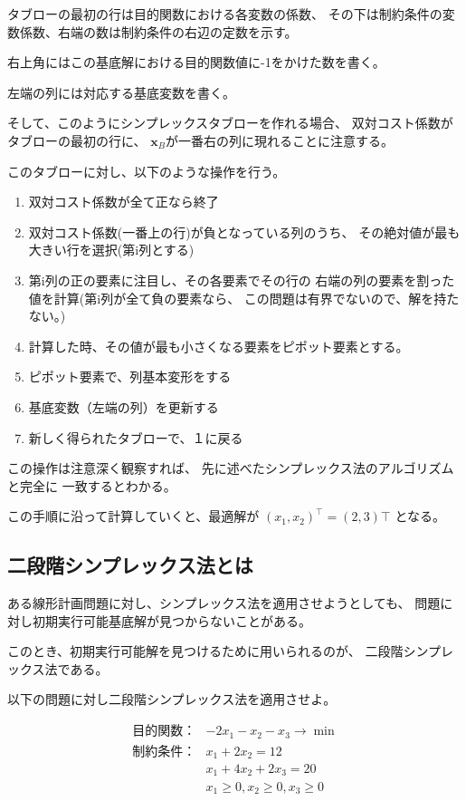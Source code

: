 \documentclass[9pt]{ltjsreport}
\begin{document}
タブローの最初の行は目的関数における各変数の係数、
その下は制約条件の変数係数、右端の数は制約条件の右辺の定数を示す。

右上角にはこの基底解における目的関数値に-1をかけた数を書く。

左端の列には対応する基底変数を書く。

そして、このようにシンプレックスタブローを作れる場合、
双対コスト係数がタブローの最初の行に、
$\bm{x}_B$が一番右の列に現れることに注意する。

このタブローに対し、以下のような操作を行う。

\begin{enumerate}
    \item 双対コスト係数が全て正なら終了
    \item 双対コスト係数(一番上の行)が負となっている列のうち、
    その絶対値が最も大きい行を選択(第i列とする)
    \item 第i列の正の要素に注目し、その各要素でその行の
    右端の列の要素を割った値を計算(第i列が全て負の要素なら、
    この問題は有界でないので、解を持たない。)
    \item 計算した時、その値が最も小さくなる要素をピポット要素とする。
    \item ピポット要素で、列基本変形をする
    \item 基底変数（左端の列）を更新する
    \item 新しく得られたタブローで、１に戻る
\end{enumerate}
この操作は注意深く観察すれば、
先に述べたシンプレックス法のアルゴリズムと完全に
一致するとわかる。

この手順に沿って計算していくと、最適解が
$(x_1,x_2)^\top =(2,3)\top$
となる。

\newpage

\subsection{二段階シンプレックス法とは}
ある線形計画問題に対し、シンプレックス法を適用させようとしても、
問題に対し初期実行可能基底解が見つからないことがある。

このとき、初期実行可能解を見つけるために用いられるのが、
二段階シンプレックス法である。

以下の問題に対し二段階シンプレックス法を適用させよ。

\begin{align}
    \text{目的関数：}&-2x_1-x_2-x_3\longrightarrow \min \\
    \text{制約条件：}&x_1+2x_2=12\\
                   &x_1+4x_2+2x_3=20\\
                   &x_1\ge 0,x_2\ge 0,x_3\ge 0
\end{align}
\end{document}
